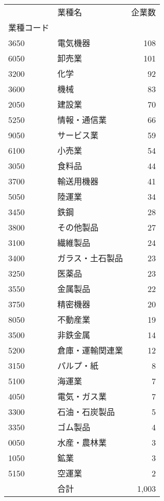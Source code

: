 \begin{tabular}{llr}
\toprule
{} &       業種名 &  企業数 \\
業種コード &           &      \\
\midrule
3650  &      電気機器 &  108 \\
6050  &       卸売業 &  101 \\
3200  &        化学 &   92 \\
3600  &        機械 &   83 \\
2050  &       建設業 &   70 \\
5250  &    情報・通信業 &   66 \\
9050  &     サービス業 &   59 \\
6100  &       小売業 &   54 \\
3050  &       食料品 &   44 \\
3700  &     輸送用機器 &   41 \\
5050  &       陸運業 &   34 \\
3450  &        鉄鋼 &   28 \\
3800  &     その他製品 &   27 \\
3100  &      繊維製品 &   24 \\
3400  &  ガラス・土石製品 &   23 \\
3250  &       医薬品 &   23 \\
3550  &      金属製品 &   22 \\
3750  &      精密機器 &   20 \\
8050  &      不動産業 &   19 \\
3500  &      非鉄金属 &   14 \\
5200  &  倉庫・運輸関連業 &   12 \\
3150  &     パルプ・紙 &    8 \\
5100  &       海運業 &    7 \\
4050  &    電気・ガス業 &    7 \\
3300  &   石油・石炭製品 &    5 \\
3350  &      ゴム製品 &    4 \\
0050  &    水産・農林業 &    3 \\
1050  &        鉱業 &    3 \\
5150  &       空運業 &    2 \\ \cline{2-3}
      &         合計 & 1,003 \\
\bottomrule
\end{tabular}
